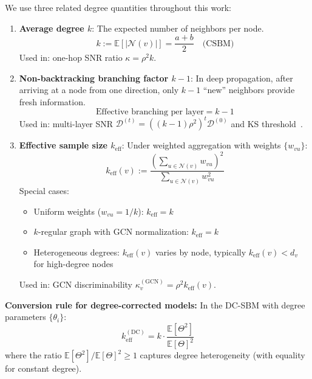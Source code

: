 \begin{remark}
\label{rem:k_notation_unified}
We use three related degree quantities throughout this work:

\begin{enumerate}
    \item \textbf{Average degree $k$}: The expected number of neighbors per node.
    \begin{equation}
        k := \mathbb{E}[|\mathcal{N}(v)|] = \frac{a+b}{2} \quad \text{(CSBM)}
    \end{equation}
    Used in: one-hop SNR ratio $\kappa = \rho^2 k$.

    \item \textbf{Non-backtracking branching factor $k-1$}: In deep propagation, after arriving at a node from one direction, only $k-1$ ``new'' neighbors provide fresh information.
    \begin{equation}
        \text{Effective branching per layer} = k - 1
    \end{equation}
    Used in: multi-layer SNR $\mathcal{D}^{(t)} = ((k-1)\rho^2)^t \mathcal{D}^{(0)}$ and KS threshold~\cite{kesten1966additional}.

    \item \textbf{Effective sample size $k_{\mathrm{eff}}$}: Under weighted aggregation with weights $\{w_{vu}\}$:
    \begin{equation}
        k_{\mathrm{eff}}(v) := \frac{\left(\sum_{u \in \mathcal{N}(v)} w_{vu}\right)^2}{\sum_{u \in \mathcal{N}(v)} w_{vu}^2}
    \end{equation}
    Special cases:
    \begin{itemize}
        \item Uniform weights ($w_{vu} = 1/k$): $k_{\mathrm{eff}} = k$
        \item $k$-regular graph with GCN normalization: $k_{\mathrm{eff}} = k$
        \item Heterogeneous degrees: $k_{\mathrm{eff}}(v)$ varies by node, typically $k_{\mathrm{eff}}(v) < d_v$ for high-degree nodes
    \end{itemize}
    Used in: GCN discriminability $\kappa_v^{(\mathrm{GCN})} = \rho^2 k_{\mathrm{eff}}(v)$.
\end{enumerate}

\textbf{Conversion rule for degree-corrected models:} In the DC-SBM with degree parameters $\{\theta_i\}$:
\begin{equation}
    k_{\mathrm{eff}}^{(\mathrm{DC})} = k \cdot \frac{\mathbb{E}[\Theta^2]}{\mathbb{E}[\Theta]^2}
\end{equation}
where the ratio $\mathbb{E}[\Theta^2]/\mathbb{E}[\Theta]^2 \geq 1$ captures degree heterogeneity (with equality for constant degree).


\end{remark}
